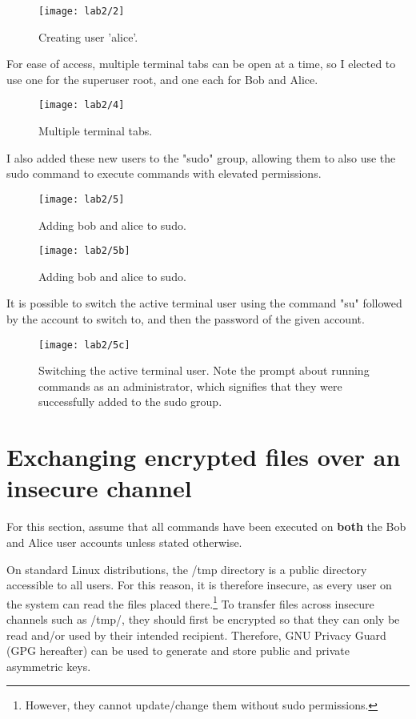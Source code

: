 \begin{figure}[H]
    \centering
    \texttt{[image: lab2/2]}
    \caption{Creating user 'alice'.}
    \label{fig:createAlice}
\end{figure}

For ease of access, multiple terminal tabs can be open at a time, so I elected to use one for the superuser root,
and one each for Bob and Alice.

\begin{figure}[H]
    \centering
    \texttt{[image: lab2/4]}
    \caption{Multiple terminal tabs.}
    \label{fig:terminalTabs}
\end{figure}

I also added these new users to the "sudo" group, allowing them to also use the sudo command to execute commands
with elevated permissions.

\begin{figure}[H]
    \centering
    \texttt{[image: lab2/5]}
    \caption{Adding bob and alice to sudo.}
    \label{fig:sudoAdd1}
\end{figure}

\begin{figure}[H]
    \centering
    \texttt{[image: lab2/5b]}
    \caption{Adding bob and alice to sudo.}
    \label{fig:sudoAdd2}
\end{figure}

It is possible to switch the active terminal user using the command "su" followed by the account to switch to,
and then the password of the given account.

\begin{figure}[H]
    \centering
    \texttt{[image: lab2/5c]}
    \caption{Switching the active terminal user. Note the prompt about running commands as an administrator,
    which signifies that they were successfully added to the sudo group.}
    \label{fig:suBobAlice}
\end{figure}

\pagebreak

\section{Exchanging encrypted files over an insecure channel}\label{sec:tmpExchange}
\begin{tcolorbox}[colback=blue!5!white,colframe=blue!75!black]
    For this section, assume that all commands have been executed on \textbf{both} the Bob and Alice
    user accounts unless stated otherwise.
\end{tcolorbox}
On standard Linux distributions, the /tmp directory is a public directory accessible to all users.
For this reason, it is therefore insecure, as every user on the system can read the files placed there.\footnote{However, they cannot update/change them without sudo permissions.}
To transfer files across insecure channels such as /tmp/, they should first be encrypted so that
they can only be read and/or used by their intended recipient.
Therefore, GNU Privacy Guard (GPG hereafter) can be used to generate and store public
and private asymmetric keys.

